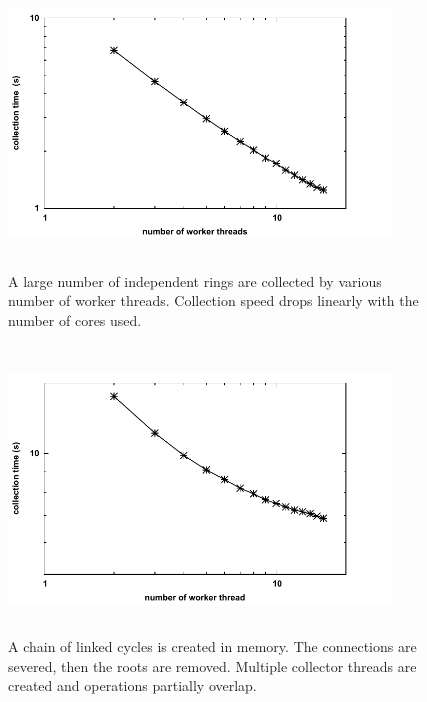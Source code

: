 \begin{figure}[h!]
  \centering
  \includegraphics[height=3.0in,width=4.0in]{figs/CleanupTimeperObjectonly16log}
  \caption{
  A large number of independent rings are collected by various number of
  worker threads. Collection speed drops linearly with the number of
  cores used.
  }
   \label{fig:scale}
  \end{figure}

\begin{figure}[h!]
  \centering
  \includegraphics[height=3.0in,width=4.0in]{figs/collapseoverheadonly16log}
  \caption{A chain of linked cycles is created in memory. The connections are severed,
  then the roots are removed. Multiple collector threads are created and operations
  partially overlap.}
   \label{fig:overhead}
  \end{figure}


